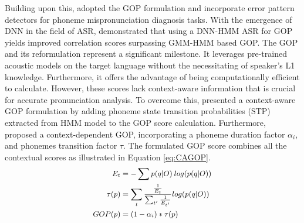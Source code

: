 \documentclass[11pt]{article}
\begin{document}
\noindent Building upon this, \citet{wang2012improved} adopted the GOP formulation and incorporate error pattern detectors for phoneme mispronunciation diagnosis tasks. With the emergence of DNN in the field of ASR, \citet{DNN1, DNN4, DNN5} demonstrated that using a DNN-HMM ASR for GOP yields improved correlation scores surpassing GMM-HMM based GOP. The GOP and its reformulation represent a significant milestone. It leverages pre-trained acoustic models on the target language without the necessitating of speaker's L1 knowledge. Furthermore, it offers the advantage of being computationally efficient to calculate. However, %
these scores lack context-aware information that is crucial for accurate pronunciation analysis. To overcome this, \citet{STP} presented a context-aware GOP formulation by adding phoneme state transition probabilities (STP) extracted from HMM model to the GOP score calculation. Furthermore, \citet{CA-GOP} proposed a context-dependent GOP, incorporating a phoneme duration factor $\alpha_i$, and phonemes transition factor $\tau$. The formulated GOP score combines all the contextual scores as illustrated in Equation \ref{eq:CAGOP}.
\begin{equation}\label{eq:CAGOP} 
\small
\begin{split}
 E_t &= - \sum p(q|O)\: log(p(q|O)) \\
\tau(p) &= \sum_{t} \frac{\frac{1}{E_t}}{\sum_{t'} \frac{1}{E_{t'}}} log (p(q|O)) \\
GOP(p) &= (1-\alpha_i) * \tau(p)
\end{split}
\end{equation}




\end{document}
